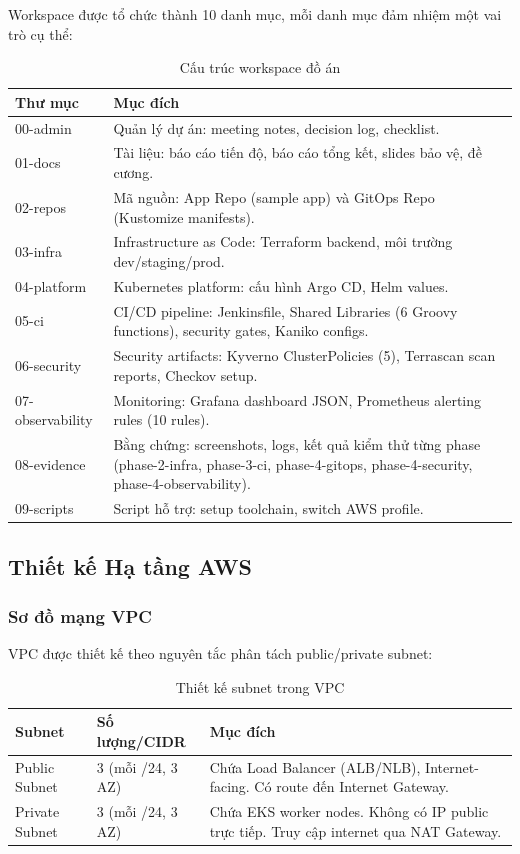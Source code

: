 \documentclass[13pt,a4paper,twoside]{extarticle}
\begin{document}
Workspace được tổ chức thành 10 danh mục, mỗi danh mục đảm nhiệm một vai trò cụ thể:

\begin{table}[H]
\centering
\begin{tabular}{@{}p{3.5cm} p{11.5cm}@{}}
\toprule
\textbf{Thư mục} & \textbf{Mục đích} \\
\midrule
00-admin & Quản lý dự án: meeting notes, decision log, checklist. \\
01-docs & Tài liệu: báo cáo tiến độ, báo cáo tổng kết, slides bảo vệ, đề cương. \\
02-repos & Mã nguồn: App Repo (sample app) và GitOps Repo (Kustomize manifests). \\
03-infra & Infrastructure as Code: Terraform backend, môi trường dev/staging/prod. \\
04-platform & Kubernetes platform: cấu hình Argo CD, Helm values. \\
05-ci & CI/CD pipeline: Jenkinsfile, Shared Libraries (6 Groovy functions), security gates, Kaniko configs. \\
06-security & Security artifacts: Kyverno ClusterPolicies (5), Terrascan scan reports, Checkov setup. \\
07-observability & Monitoring: Grafana dashboard JSON, Prometheus alerting rules (10 rules). \\
08-evidence & Bằng chứng: screenshots, logs, kết quả kiểm thử từng phase (phase-2-infra, phase-3-ci, phase-4-gitops, phase-4-security, phase-4-observability). \\
09-scripts & Script hỗ trợ: setup toolchain, switch AWS profile. \\
\bottomrule
\end{tabular}
\caption{Cấu trúc workspace đồ án}
\label{tab:workspace}
\end{table}

\subsection{Thiết kế Hạ tầng AWS}

\subsubsection{Sơ đồ mạng VPC}

VPC được thiết kế theo nguyên tắc phân tách public/private subnet:

\begin{table}[H]
\centering
\begin{tabular}{@{}p{4cm} p{5cm} p{6cm}@{}}
\toprule
\textbf{Subnet} & \textbf{Số lượng/CIDR} & \textbf{Mục đích} \\
\midrule
Public Subnet & 3 (mỗi /24, 3 AZ) & Chứa Load Balancer (ALB/NLB), Internet-facing. Có route đến Internet Gateway. \\
\midrule
Private Subnet & 3 (mỗi /24, 3 AZ) & Chứa EKS worker nodes. Không có IP public trực tiếp. Truy cập internet qua NAT Gateway. \\
\bottomrule
\end{tabular}
\caption{Thiết kế subnet trong VPC}
\label{tab:subnet-design}
\end{table}
\end{document}
